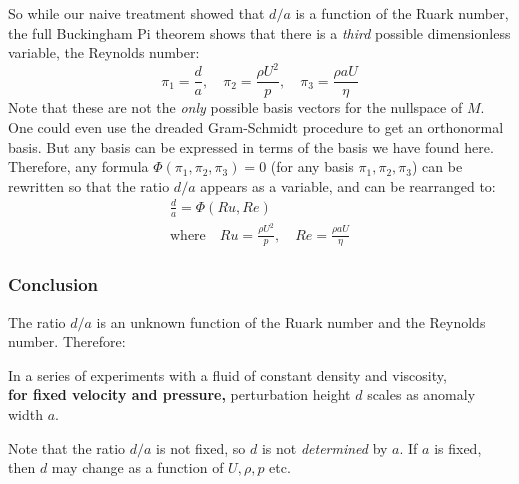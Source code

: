 \documentclass[a4paper]{report}
\begin{document}
So while our naive treatment showed that $d/a$ is a function of the Ruark number, the full Buckingham Pi theorem shows that there is a \emph{third} possible dimensionless variable, the Reynolds number:
\begin{equation*}
\pi_1 = \frac{d}{a}, \quad \pi_2 = \frac{\rho U^2}{p}, \quad
 \pi_3 = \frac{\rho a U}{\eta}
\end{equation*}
Note that these are not the \emph{only} possible basis vectors for the nullspace of $M$.  One could even use the dreaded Gram-Schmidt procedure to get an orthonormal basis.  But any basis can be expressed in terms of the basis we have found here.  Therefore, any formula $\Phi(\pi_1, \pi_2, \pi_3)=0$ (for any basis $\pi_1,\pi_2,\pi_3$) can be rewritten so that the ratio $d/a$ appears as a variable, and can be rearranged to:
\begin{gather}
\frac{d}{a} = \Phi(Ru, Re )
\\
\text{where} \quad  Ru = \frac{\rho U^2}{p}, \quad Re = \frac{\rho a U}{\eta}
\end{gather}

\subsubsection*{Conclusion}
The ratio $d/a$ is an unknown function of the Ruark number and the Reynolds number.  Therefore:

\vspace*{1em}
In a series of experiments with a fluid of constant density and viscosity,\\
\textbf{for fixed velocity and pressure,} perturbation height $d$ scales as anomaly width $a$.

\vspace{1em} 
Note that the ratio $d/a$ is not fixed, so $d$ is not \emph{determined} by $a$.  If $a$ is fixed, then $d$ may change as a function of $U, \rho, p$ etc.
\end{document}
